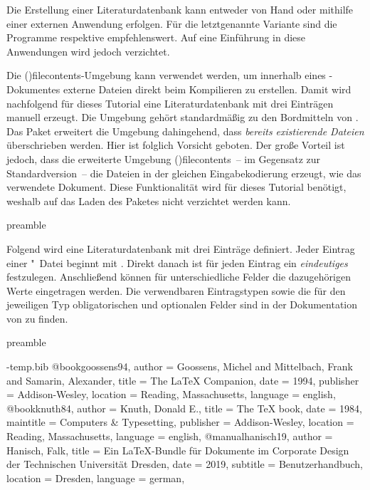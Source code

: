 \documentclass[%
  english,ngerman,%
  cdgeometry=no,DIV=12,%
  cd=false,cdfont=false,cdtitle=true,%
  headings=normal,%
  automark,%
  listof=toc,%
]{tudscrartcl}
\begin{document}
Die Erstellung einer Literaturdatenbank kann entweder von Hand oder mithilfe 
einer externen Anwendung erfolgen. Für die letztgenannte Variante sind die 
Programme  respektive  empfehlenswert. 
Auf eine Einführung in diese Anwendungen wird jedoch verzichtet. 

Die \Environment(){filecontents}-Umgebung kann verwendet 
werden, um innerhalb eines -Dokumentes externe Dateien direkt 
beim Kompilieren zu erstellen. Damit wird nachfolgend für dieses Tutorial eine 
Literaturdatenbank  mit drei Einträgen manuell erzeugt.
Die Umgebung gehört standardmäßig zu den Bordmitteln von . Das 
Paket  erweitert die Umgebung dahingehend, dass 
\emph{bereits existierende Dateien} überschrieben werden. Hier ist folglich 
Vorsicht geboten. Der große Vorteil ist jedoch, dass die erweiterte Umgebung 
\Environment(){filecontents}~-- im Gegensatz zur 
Standardversion~-- die Dateien in der gleichen Eingabekodierung erzeugt, wie 
das verwendete Dokument. Diese Funktionalität wird für dieses Tutorial 
benötigt, weshalb auf das Laden des Paketes  nicht 
verzichtet werden kann. 
%
\begin{Code}{preamble}
\usepackage{filecontents}
\end{Code}

Folgend wird eine Literaturdatenbank mit drei Einträge definiert. Jeder Eintrag 
einer "~Datei beginnt mit . Direkt 
danach ist für jeden Eintrag ein \emph{eindeutiges}  
festzulegen. Anschließend können für unterschiedliche Felder die dazugehörigen 
Werte eingetragen werden. Die verwendbaren Eintragstypen sowie die für den 
jeweiligen Typ obligatorischen und optionalen Felder sind in der Dokumentation 
von  zu finden.
%
\begin{Code}[input]{preamble}
\begin{filecontents}{\jobname-temp.bib}
@book{goossens94,
  author    = {Goossens, Michel and Mittelbach, Frank
               and Samarin, Alexander},
  title     = {The \LaTeX{} Companion},
  date      = {1994},
  publisher = {Addison-Wesley},
  location  = {Reading, Massachusetts},
  language  = {english},
}
@book{knuth84,
  author    = {Knuth, Donald E.},
  title     = {The \TeX{} book},
  date      = {1984},
  maintitle = {Computers \& Typesetting},
  publisher = {Addison-Wesley},
  location  = {Reading, Massachusetts},
  language  = {english},
}
@manual{hanisch19,
  author    = {Hanisch, Falk},
  title     = {Ein \LaTeX-Bundle für Dokumente im
               Corporate Design der Technischen Universität Dresden},
  date      = {2019},
  subtitle  = {Benutzerhandbuch},
  location  = {Dresden},
  language  = {german},
}
\end{filecontents}
\end{Code}
\end{document}
